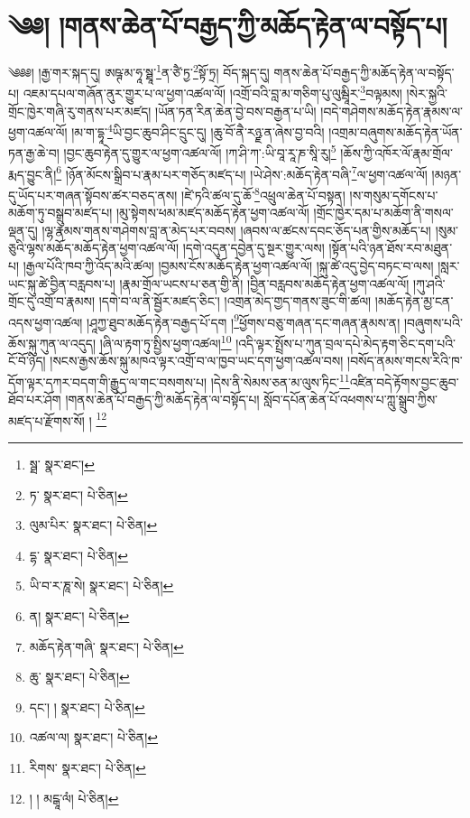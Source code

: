 \setcounter{footnote}{0} 
\chapter{༄༅། །གནས་ཆེན་པོ་བརྒྱད་ཀྱི་མཆོད་རྟེན་ལ་བསྟོད་པ།}༄༅༅། །རྒྱ་གར་སྐད་དུ། ཨཥྚ་མ་ཧཱ་སྠཱ་\footnote{སྠ་  སྣར་ཐང་། }ན་ཙཻ་ཏྱ་\footnote{ཏ་  སྣར་ཐང་།  པེ་ཅིན། }སྟོ་ཏྲ། བོད་སྐད་དུ། གནས་ཆེན་པོ་བརྒྱད་ཀྱི་མཆོད་རྟེན་ལ་བསྟོད་པ། འཇམ་དཔལ་གཞོན་ནུར་གྱུར་པ་ལ་ཕྱག་འཚལ་ལོ། །འགྲོ་བའི་བླ་མ་གཅིག་པུ་ལུམྦཱིར་\footnote{ལུམ་པིར་  སྣར་ཐང་།  པེ་ཅིན། }བལྟམས། །སེར་སྐྱའི་གྲོང་ཁྱེར་གཞི་རུ་གནས་པར་མཛད། །ཡོན་ཏན་རིན་ཆེན་བྱེ་བས་བརྒྱན་པ་ཡི། །བདེ་གཤེགས་མཆོད་རྟེན་རྣམས་ལ་ཕྱག་འཚལ་ལོ། །མ་ག་དྷཱ་\footnote{དྷ་  སྣར་ཐང་།  པེ་ཅིན། }ཡི་བྱང་ཆུབ་ཤིང་དྲུང་དུ། །ཆུ་བོ་ནཻ་རཉྫ་ན་ཞེས་བྱ་བའི། །འགྲམ་བཞུགས་མཆོད་རྟེན་ཡོན་ཏན་རྒྱ་ཆེ་བ། །བྱང་ཆུབ་རྟེན་དུ་གྱུར་ལ་ཕྱག་འཚལ་ལོ། །ཀ་ཤི་ཀ་:ཡི་བཱ་རཱ་ཎ་སཱི་རུ།\footnote{ཡི་བ་ར་ཎཱ་སེ།  སྣར་ཐང་།  པེ་ཅིན། } །ཆོས་ཀྱི་འཁོར་ལོ་རྣམ་གྲོལ་རྨད་བྱུང་ནི།\footnote{ན།  སྣར་ཐང་།  པེ་ཅིན། } །ཉོན་མོངས་སྒྲིབ་པ་རྣམ་པར་གཅོད་མཛད་པ། །ཡེ་ཤེས་:མཆོད་རྟེན་བཞི་\footnote{མཆོད་རྟེན་གཞི་  སྣར་ཐང་།  པེ་ཅིན། }ལ་ཕྱག་འཚལ་ལོ། །མཉན་དུ་ཡོད་པར་གཞན་སྟོབས་ཚར་བཅད་ནས། །ཛེ་ཏའི་ཚལ་དུ་ཆོ་\footnote{ཆུ་  སྣར་ཐང་།  པེ་ཅིན། }འཕྲུལ་ཆེན་པོ་བསྟན། །ས་གསུམ་དགོངས་པ་མཆོག་ཏུ་བསྒྲུབ་མཛད་པ། །མུ་སྟེགས་ཕམ་མཛད་མཆོད་རྟེན་ཕྱག་འཚལ་ལོ། །གྲོང་ཁྱེར་དམ་པ་མཆོག་ནི་གསལ་ལྡན་དུ། །ལྷ་རྣམས་གནས་གཤེགས་བླ་ན་མེད་པར་བབས། །ཞབས་ལ་ཚངས་དབང་ཅོད་པན་གྱིས་མཆོད་པ། །སུམ་ཅུའི་ལྷས་མཆོད་མཆོད་རྟེན་ཕྱག་འཚལ་ལོ། །དགེ་འདུན་དབྱེན་དུ་སྔར་གྱུར་ལས། །སྟོན་པའི་ཉན་ཐོས་རབ་མཐུན་པ། །རྒྱལ་པོའི་ཁབ་ཀྱི་འོད་མའི་ཚལ། །བྱམས་ངོས་མཆོད་རྟེན་ཕྱག་འཚལ་ལོ། །སྐུ་ཚེ་འདུ་བྱེད་བཏང་བ་ལས། །སླར་ཡང་སྐུ་ཚེ་བྱིན་བརླབས་པ། །རྣམ་གྲོལ་ཡངས་པ་ཅན་གྱི་ནི། །བྱིན་བརླབས་མཆོད་རྟེན་ཕྱག་འཚལ་ལོ། །ཀུ་ཤའི་གྲོང་དུ་འགྲོ་བ་རྣམས། །དགེ་བ་ལ་ནི་སྦྱོར་མཛད་ཅིང་། །འགྲན་མེད་གྱད་གནས་ཟུང་གི་ཚལ། །མཆོད་རྟེན་མྱ་ངན་འདས་ཕྱག་འཚལ། །ཤཱཀྱ་ཐུབ་མཆོད་རྟེན་བརྒྱད་པོ་དག །\footnote{དང་། །  སྣར་ཐང་།  པེ་ཅིན། }ཕྱོགས་བཅུ་གཞན་དང་གཞན་རྣམས་ན། །བཞུགས་པའི་ཆོས་སྐུ་ཀུན་ལ་འདུད། །ཞི་ལ་རྟག་ཏུ་སྤྱིས་ཕྱག་འཚལ།\footnote{འཚལ་ལ།  སྣར་ཐང་།  པེ་ཅིན། } །འདི་ལྟར་སྤྲོས་པ་ཀུན་བྲལ་དཔེ་མེད་རྟག་ཅིང་དག་པའི་ངོ་བོ་ཉིད། །སངས་རྒྱས་ཆོས་སྐུ་མཁའ་ལྟར་འགྲོ་བ་ལ་ཁྱབ་ཡང་དག་ཕྱག་འཚལ་བས། །བསོད་ནམས་གངས་རིའི་ཁ་དོག་ལྟར་དཀར་བདག་གི་རྒྱུད་ལ་གང་བསགས་པ། །དེས་ནི་སེམས་ཅན་མ་ལུས་ཏིང་\footnote{རིགས་  སྣར་ཐང་།  པེ་ཅིན། }འཛིན་བདེ་རྟོགས་བྱང་ཆུབ་ཐོབ་པར་ཤོག །གནས་ཆེན་པོ་བརྒྱད་ཀྱི་མཆོད་རྟེན་ལ་བསྟོད་པ། སློབ་དཔོན་ཆེན་པོ་འཕགས་པ་ཀླུ་སྒྲུབ་ཀྱིས་མཛད་པ་རྫོགས་སོ། ། \footnote{། ། མངྒཱ་ལཾ།  པེ་ཅིན། }